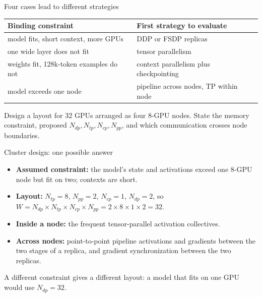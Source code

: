\documentclass[handout]{beamer}
\begin{document}
\begin{frame}{Four cases lead to different strategies}
  \small
  \begin{tabular}{p{.41\linewidth}p{.49\linewidth}}
    \toprule
    Binding constraint & First strategy to evaluate \\
    \midrule
    model fits, short context, more GPUs & DDP or FSDP replicas \\
    one wide layer does not fit & tensor parallelism \\
    weights fit, 128k-token examples do not & context parallelism plus checkpointing \\
    model exceeds one node & pipeline across nodes, TP within node \\
    \bottomrule
  \end{tabular}
\end{frame}

{Design a layout for 32 GPUs arranged as four 8-GPU nodes. State the memory constraint, proposed $N_{dp},N_{tp},N_{cp},N_{pp}$, and which communication crosses node boundaries.}

\begin{frame}{Cluster design: one possible answer}
  \begin{itemize}
      \setlength{\itemsep}{8pt}
    \item \textbf{Assumed constraint:} the model's state and activations exceed one 8-GPU node but fit on two; contexts are short.
    \item \textbf{Layout:} $N_{tp}=8$, $N_{pp}=2$, $N_{cp}=1$, $N_{dp}=2$, so $W=N_{dp}\times N_{tp}\times N_{cp}\times N_{pp}=2\times8\times1\times2=32$.
    \item \textbf{Inside a node:} the frequent tensor-parallel activation collectives.
    \item \textbf{Across nodes:} point-to-point pipeline activations and gradients between the two stages of a replica, and gradient synchronization between the two replicas.
  \end{itemize}
  \vfill
  \small A different constraint gives a different layout: a model that fits on one GPU would use $N_{dp}=32$.
\end{frame}
\end{document}

